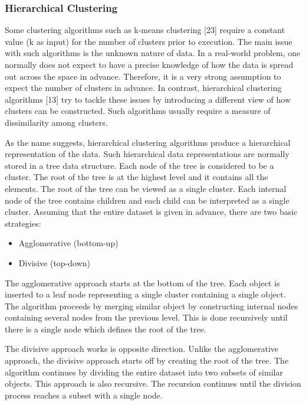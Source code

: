 \documentclass[a4paper, 12pt]{article}
\begin{document}
\subsubsection{Hierarchical Clustering}
Some clustering algorithms such as k-means clustering [23] require a constant value (k as input) for the number of clusters prior to execution. The main issue with such algorithms is the unknown nature of data. In a real-world problem, one normally does not expect to have a precise knowledge of how the data is spread out across the space in advance. Therefore, it is a very strong assumption to expect the number of clusters in advance. In contrast, hierarchical clustering algorithms [13] try to tackle these issues by introducing a different view of how clusters can be constructed. Such algorithms usually require a measure of dissimilarity among clusters.

As the name suggests, hierarchical clustering algorithms produce a hierarchical representation of the data. Such hierarchical data representations are normally stored in a tree data structure. Each node of the tree is considered to be a cluster. The root of the tree is at the highest level and it contains all the elements. The root of the tree can be viewed as a single cluster. Each internal node of the tree contains children and each child can be interpreted as a single cluster. Assuming that the entire dataset is given in advance, there are two basic strategies:

\begin{itemize}
    \item Agglomerative (bottom-up)
    \item Divisive (top-down)
\end{itemize}

The agglomerative approach starts at the bottom of the tree. Each object is inserted to a leaf node representing a single cluster containing a single object. The algorithm proceeds by merging similar object by constructing internal nodes containing several nodes from the previous level. This is done recursively until there is a single node which defines the root of the tree.

The divisive approach works is opposite direction. Unlike the agglomerative approach, the divisive approach starts off by creating the root of the tree. The algorithm continues by dividing the entire dataset into two subsets of similar objects. This approach is also recursive. The recursion continues until the division process reaches a subset with a single node. 
\end{document}
